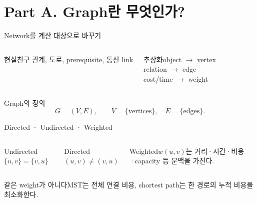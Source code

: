 \section{Part A. Graph란 무엇인가?}
\begin{frame}{Network를 계산 대상으로 바꾸기}
\begin{columns}[T]\begin{block}{현실}친구 관계, 도로, prerequisite, 통신 link\end{block}
\begin{block}{추상화}object $\to$ vertex\\relation $\to$ edge\\cost/time $\to$ weight\end{block}\end{columns}
\end{frame}
\begin{frame}{Graph의 정의}
\[
G=(V,E),\qquad V=\{\text{vertices}\},\quad E=\{\text{edges}\}.
\]
\centering{}
\end{frame}
\begin{frame}{Directed · Undirected · Weighted}
\begin{columns}[T]\begin{block}{Undirected}$\{u,v\}=\{v,u\}$\end{block}
\begin{block}{Directed}$(u,v)\ne(v,u)$\end{block}
\begin{block}{Weighted}$w(u,v)$는 거리·시간·비용·capacity 등 문맥을 가진다.\end{block}\end{columns}
\begin{alertblock}{같은 weight가 아니다}MST는 전체 연결 비용, shortest path는 한 경로의 누적 비용을 최소화한다.\end{alertblock}
\end{frame}
